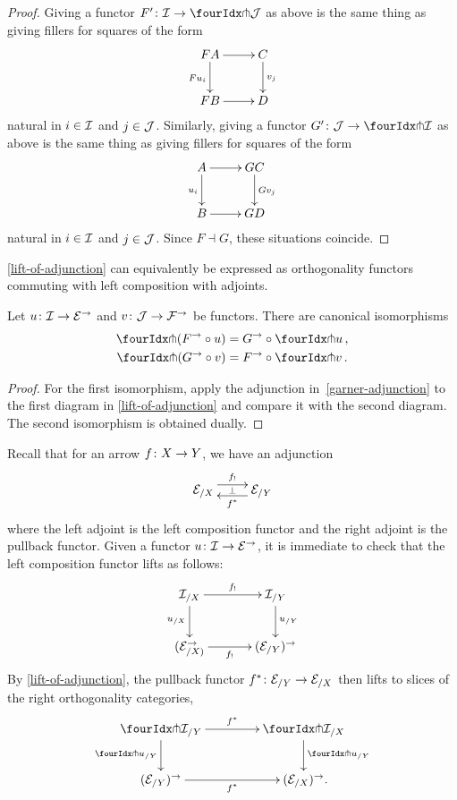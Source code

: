 \documentclass[reqno,10pt,a4paper,oneside,draft]{amsart}
\begin{document}
\begin{proof}
Giving a functor $F' \co \cal{I} \to \liftl{\cal{J}}$ as above is the same thing as giving fillers for squares of the form
\[
\xymatrix{
  FA \ar[d]_{F u_i} \ar[r] & C \ar[d]^{v_j} \\
  FB \ar[r] & D
}
\]
natural in $i \in \cal{I}$ and $j \in \cal{J}$.
Similarly, giving a functor $G' \co \cal{J} \to \liftl{\cal{I}}$ as above is the same thing as giving fillers for squares of the form
\[
\xymatrix{
  A \ar[d]_{u_i} \ar[r] & GC \ar[d]^{Gv_j} \\
  B \ar[r] & GD
}
\]
natural in $i \in \cal{I}$ and $j \in \cal{J}$.
Since $F \dashv G$, these situations coincide.
\end{proof}

\cref{lift-of-adjunction} can equivalently be expressed as orthogonality functors commuting with left composition with adjoints.


\begin{corollary} \label{pitchfork-adjunction}
Let $u \co \cal{I} \to \cal{E}^\to$ and $v \co \cal{J} \to \cal{F}^\to$ be functors. There are canonical isomorphisms
\begin{align*}
  \liftr{(F^\to \cc u)} &= G^\to \cc \liftr{u}
\, ,\\
  \liftl{(G^\to \cc v)} &= F^\to \cc \liftl{v}
\, .
\end{align*}
\end{corollary}

\begin{proof}
For the first isomorphism, apply the adjunction in~\eqref{garner-adjunction} to the first diagram in \cref{lift-of-adjunction} and compare it with the second diagram.
The second isomorphism is obtained dually.
\end{proof}


\begin{example} \label{exa:composition-pullback-lift} 
Recall that for an arrow $f \co X \to Y$, we have an adjunction 
\[
\xymatrix{
\cal{E}_{/X} \ar@<1ex>[r]^{f_{!}} \ar@{}[r]|{\bot} & \cal{E}_{/Y} \ar@<1ex>[l]^{f^*}} 
\]
where the left adjoint is the left composition functor and the right adjoint is the pullback functor. 
Given a functor $u \co \cal{I} \to \cal{E}^\to$, it is immediate to check that the left composition
functor lifts as follows:
\[
\xymatrix@C+1em{
  \cal{I}_{/X}
  \ar[r]^-{f_!}
  \ar[d]_{u_{/X}}
&
  \cal{I}_{/Y}
  \ar[d]^{u_{/Y}}
\\
  (\calE_{/X)}^\to
  \ar[r]_-{f_!}
&
  (\calE_{/Y})^\to
}
\]
By \cref{lift-of-adjunction}, the pullback functor $f^* \co \cal{E}_{/Y} \to \cal{E}_{/X}$ then lifts to slices of the right orthogonality categories,
\[
\xymatrix@C=1.5cm{
  \liftr{\cal{I}}_{/Y}
  \ar[d]_{\liftr{u}_{/Y}}
  \ar[r]^{f^*}
&
  \liftr{\cal{I}}_{/X}
  \ar[d]^{\liftr{u}_{/Y}}
\\
  (\catE_{/Y})^\to
  \ar[r]_{f^*}
&
  (\catE_{/X})^\to \rlap{.}
}
\]
\end{example}
\end{document}
